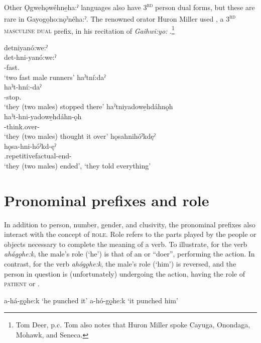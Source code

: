 Other Ǫgwehǫwéhne̱ha:ˀ languages also  have \textsc{3\textsuperscript{rd}} person dual forms, but these are rare in Gayogo̱ho:nǫˀnéha:ˀ. The renowned orator Huron Miller used , a \textsc{3\textsuperscript{rd} masculine dual} prefix, in his recitation of \textit{Gaihwi:yo:} .\footnote{Tom Deer, p.c. Tom also notes that Huron Miller spoke Cayuga, Onondaga, Mohawk, and Seneca.}

\ea\label{ex:3rdex200}
\ea detniyanó:we:ˀ \\
\gll det-hni-yanó:we:ˀ\\ 
{\dualiccislocative}-fast.{\stative}\\
\glt ‘two fast male runners’
\ex haˀtní:daˀ \\
\gll haˀt-hní:-daˀ \\
{\translocativedualic}-stop.{\punctual}\\
\glt ‘they (two males) stopped there’
\ex haˀtniyadowe̱hdáhnǫh \\
\gll haˀt-hni-yadowe̱hdáhn-ǫh \\
{\translocativedualic}-think.over-{\stative}\\
\glt ‘they (two males) thought it over’
\ex hǫsahnihóˀkdęˀ \\
\gll hǫsa-hni-hóˀkd-ęˀ\\
{\translocative.repetitivefactual}-end-{\punctual}\\
\glt ‘they (two males) ended’, ‘they told everything’
\z
\z

\section{Pronominal prefixes and role} \label{Pronominal prefixes and role}
In addition to person, number, gender, and clusivity, the pronominal prefixes also interact with the concept of \textsc{role}. Role refers to the parts played by the people or objects necessary to complete the meaning of a verb. To illustrate, for the verb \textit{ahágǫ̱he:k}, the male’s role (‘he’) is that of an  or “doer”, performing the action. In contrast, for the verb \textit{ahógǫ̱he:k}, the male’s role (‘him’) is reversed, and the person in question is (unfortunately) undergoing the action, having the role of \textsc{patient} or {\undergoer} .

\ea\label{ex:rolex100}
\ea a-há-gǫ̱he:k ‘he punched it’
\ex a-hó-gǫ̱he:k ‘it punched him’
\z
\z

